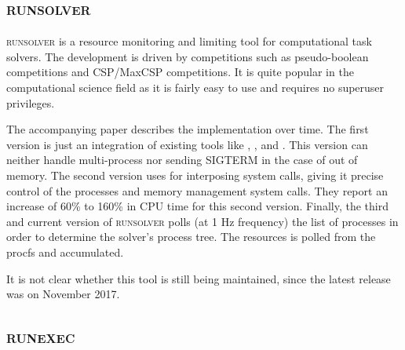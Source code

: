 

\subsection{\textsc{runsolver}}
\label{sec:resource.impl.runsolver}

\textsc{runsolver} \citep{rousselControllingSolverExecution2011} is a resource monitoring and limiting tool for computational task solvers.
The development is driven by competitions such as pseudo-boolean competitions\label{sec:resource.difficulties} and CSP/MaxCSP competitions.
It is quite popular in the computational science field as it is fairly easy to use and requires no superuser privileges.

The accompanying paper describes the implementation over time.
The first version is just an integration of existing tools like , , and .
This version can neither handle multi-process nor sending SIGTERM in the case of out of memory.
The second version uses  for interposing system calls, giving it precise control of the processes and memory management system calls.
They report an increase of 60\% to 160\% in CPU time for this second version.
Finally, the third and current version of \textsc{runsolver} polls (at 1 Hz frequency) the list of processes in order to determine the solver's process tree.
The resources is polled from the procfs and accumulated.

It is not clear whether this tool is still being maintained, since the latest release was on November 2017.


\subsection{\textsc{runexec}}

